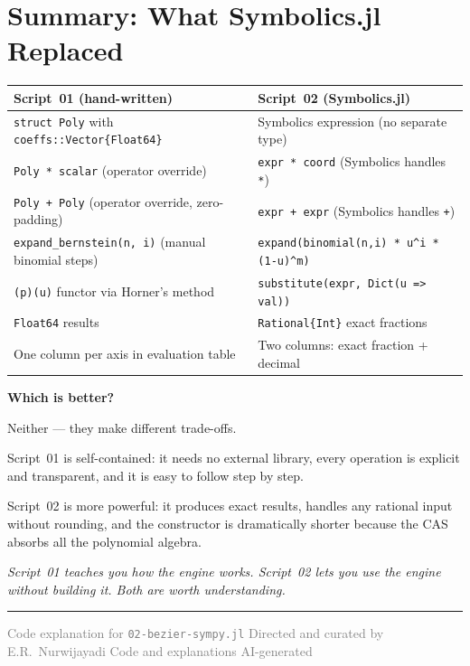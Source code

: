 \documentclass[12pt, a4paper]{article}
\newcommand{\cd}[1]{\texttt{#1}}
\begin{document}
\section{Summary: What Symbolics.jl Replaced}

\begin{center}
\begin{tabular}{p{5cm}p{5cm}}
\toprule
Script~01 (hand-written) & Script~02 (Symbolics.jl) \\
\midrule
\cd{struct Poly} with \cd{coeffs::Vector\{Float64\}} &
  Symbolics expression (no separate type) \\[4pt]
\cd{Poly * scalar} (operator override) &
  \cd{expr * coord} (Symbolics handles \cd{*}) \\[4pt]
\cd{Poly + Poly} (operator override, zero-padding) &
  \cd{expr + expr} (Symbolics handles \cd{+}) \\[4pt]
\cd{expand\_bernstein(n, i)} (manual binomial steps) &
  \cd{expand(binomial(n,i) * u\^{}i * (1-u)\^{}m)} \\[4pt]
\cd{(p)(u)} functor via Horner's method &
  \cd{substitute(expr, Dict(u => val))} \\[4pt]
\cd{Float64} results &
  \cd{Rational\{Int\}} exact fractions \\[4pt]
One column per axis in evaluation table &
  Two columns: exact fraction + decimal \\
\bottomrule
\end{tabular}
\end{center}

\begin{notebox}
\textbf{Which is better?}

Neither --- they make different trade-offs.

Script~01 is self-contained: it needs no external library,
every operation is explicit and transparent, and it is easy
to follow step by step.

Script~02 is more powerful: it produces exact results,
handles any rational input without rounding, and the
constructor is dramatically shorter because the CAS
absorbs all the polynomial algebra.

\textit{Script~01 teaches you how the engine works.
Script~02 lets you use the engine without building it.
Both are worth understanding.}
\end{notebox}

\vspace{2em}\hrule\vspace{0.5em}
{\small\textcolor{gray}{%
Code explanation for \texttt{02-bezier-sympy.jl}
\textbar{} Directed and curated by E.R.\ Nurwijayadi
\textbar{} Code and explanations AI-generated}}
\end{document}
